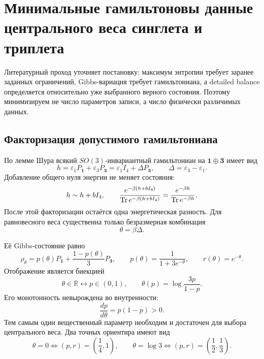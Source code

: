 \chapter{Минимальные гамильтоновы данные центрального веса синглета и триплета}
\label{ch:v8-baryon-c0-singlet-triplet-central-weight-minimal-hamiltonian-data-gate}

Литературный проход уточняет постановку: максимум энтропии требует заранее
заданных ограничений, Gibbs-вариация требует гамильтониана, а detailed
balance определяется относительно уже выбранного верного состояния.
Поэтому минимизируем не число параметров записи, а число физически
различимых данных.

\section{Факторизация допустимого гамильтониана}

По лемме Шура всякий $SO(3)$-инвариантный гамильтониан на
$\mathbf1\oplus\mathbf3$ имеет вид
\begin{equation}
 h=\varepsilon_1P_{\mathbf1}+\varepsilon_3P_{\mathbf3}
 =\varepsilon_1I_4+\Delta P_{\mathbf3},
 \qquad \Delta=\varepsilon_3-\varepsilon_1.
 \label{eq:v8-baryon-c0-minimal-central-hamiltonian-form}
\end{equation}
Добавление общего нуля энергии не меняет состояния:
\begin{equation}
 h\sim h+bI_4,
 \qquad
 \frac{e^{-\beta(h+bI_4)}}{\operatorname{Tr} e^{-\beta(h+bI_4)}}
 =\frac{e^{-\beta h}}{\operatorname{Tr} e^{-\beta h}}.
 \label{eq:v8-baryon-c0-central-hamiltonian-shift-quotient}
\end{equation}
После этой факторизации остаётся одна энергетическая разность. Для
равновесного веса существенна только безразмерная комбинация
\begin{equation}
 \theta=\beta\Delta.
 \label{eq:v8-baryon-c0-central-dimensionless-gap}
\end{equation}

Её Gibbs-состояние равно
\begin{equation}
 \rho_\theta=p(\theta)P_{\mathbf1}
 +\frac{1-p(\theta)}{3}P_{\mathbf3},
 \qquad
 p(\theta)=\frac{1}{1+3e^{-\theta}},
 \qquad r(\theta)=e^{-\theta}.
 \label{eq:v8-baryon-c0-central-gap-gibbs-state}
\end{equation}
Отображение является биекцией
\begin{equation}
 \theta\in\mathbb R\longleftrightarrow p\in(0,1),
 \qquad
 \theta(p)=\log\frac{3p}{1-p}.
 \label{eq:v8-baryon-c0-central-gap-weight-bijection}
\end{equation}
Его монотонность невырождена во внутренности:
\begin{equation}
 \frac{dp}{d\theta}=p(1-p)>0.
 \label{eq:v8-baryon-c0-central-gap-weight-monotonicity}
\end{equation}
Тем самым один вещественный параметр необходим и достаточен для выбора
центрального веса. Два точных ориентира имеют вид
\begin{equation}
 \theta=0\Longleftrightarrow(p,r)=\left(\frac14,1\right),
 \qquad
 \theta=\log3\Longleftrightarrow(p,r)=\left(\frac12,\frac13\right).
 \label{eq:v8-baryon-c0-central-gap-two-weight-witnesses}
\end{equation}

